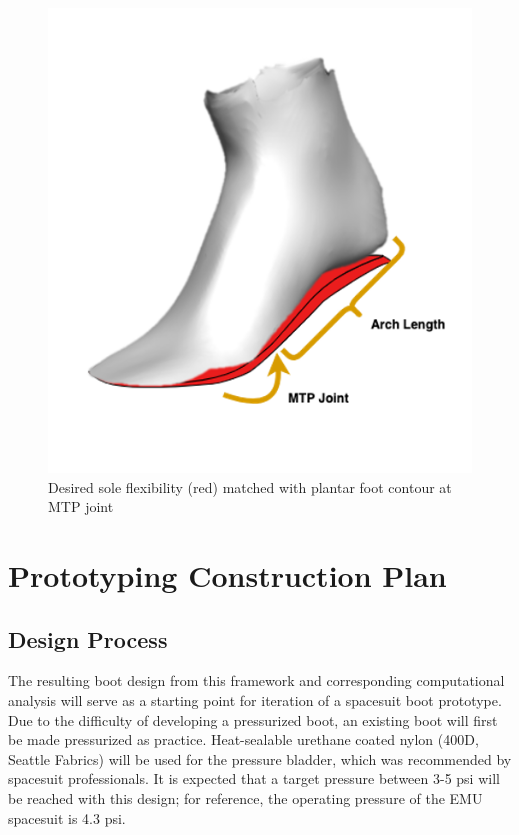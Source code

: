 \documentclass[defaultstyle,11pt]{comps}
\begin{document}
\begin{figure}
\hypertarget{fig:SA3-SoleFlex}{%
\centering
\includegraphics{../fig/SA3/SoleFlex.png}
\caption{Desired sole flexibility (red) matched with plantar foot contour at MTP joint}\label{fig:SA3-SoleFlex}
}
\end{figure}

\hypertarget{prototyping-construction-plan}{%
\section{Prototyping Construction Plan}\label{prototyping-construction-plan}}

\hypertarget{design-process}{%
\subsection{Design Process}\label{design-process}}

The resulting boot design from this framework and corresponding computational analysis will serve as a starting point for iteration of a spacesuit boot prototype.
Due to the difficulty of developing a pressurized boot, an existing boot will first be made pressurized as practice.
Heat-sealable urethane coated nylon (400D, Seattle Fabrics) will be used for the pressure bladder, which was recommended by spacesuit professionals.
It is expected that a target pressure between 3-5 psi will be reached with this design; for reference, the operating pressure of the EMU spacesuit is 4.3 psi.
\end{document}
